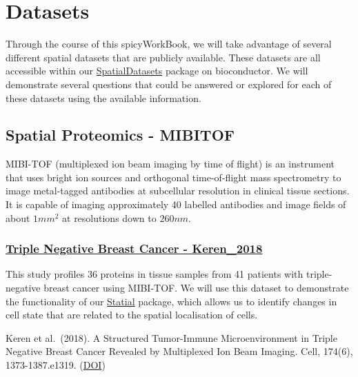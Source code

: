 \documentclass[
  letterpaper,
  DIV=11,
  numbers=noendperiod]{scrreprt}
\begin{document}
\section*{Datasets}\label{datasets}


Through the course of this spicyWorkBook, we will take advantage of
several different spatial datasets that are publicly available. These
datasets are all accessible within our
\href{https://www.bioconductor.org/packages/release/data/experiment/html/SpatialDatasets.html}{SpatialDatasets}
package on bioconductor. We will demonstrate several questions that
could be answered or explored for each of these datasets using the
available information.

\subsection*{Spatial Proteomics -
MIBITOF}\label{spatial-proteomics---mibitof}

MIBI-TOF (multiplexed ion beam imaging by time of flight) is an
instrument that uses bright ion sources and orthogonal time-of-flight
mass spectrometry to image metal-tagged antibodies at subcellular
resolution in clinical tissue sections. It is capable of imaging
approximately 40 labelled antibodies and image fields of about \(1mm^2\)
at resolutions down to \(260nm\).

\subsubsection*{\texorpdfstring{\href{datasets/Keren_2018/Keren_2018.qmd}{Triple
Negative Breast Cancer -
Keren\_2018}}{Triple Negative Breast Cancer - Keren\_2018}}\label{triple-negative-breast-cancer---keren_2018}

This study profiles 36 proteins in tissue samples from 41 patients with
triple-negative breast cancer using MIBI-TOF. We will use this dataset
to demonstrate the functionality of our
\href{https://www.bioconductor.org/packages/release/bioc/html/Statial.html}{Statial}
package, which allows us to identify changes in cell state that are
related to the spatial localisation of cells.

Keren et al.~(2018). A Structured Tumor-Immune Microenvironment in
Triple Negative Breast Cancer Revealed by Multiplexed Ion Beam Imaging.
Cell, 174(6), 1373-1387.e1319.
(\href{https://doi.org/10.1016/j.cell.2018.08.039}{DOI})
\end{document}
